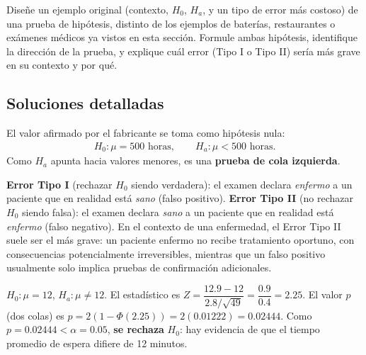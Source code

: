 \begin{problema}
	\label{prob:d04b6da}
	Diseñe un ejemplo original (contexto, $H_0$, $H_a$, y un tipo de error más costoso) de una prueba de hipótesis, distinto de los ejemplos de baterías, restaurantes o exámenes médicos ya vistos en esta sección. Formule ambas hipótesis, identifique la dirección de la prueba, y explique cuál error (Tipo I o Tipo II) sería más grave en su contexto y por qué.
\end{problema}

\subsection*{Soluciones detalladas}

\begin{solproblema}
	El valor afirmado por el fabricante se toma como hipótesis nula:
	\begin{align*}
		H_0: \mu=500\text{ horas}, \qquad H_a: \mu<500\text{ horas}.
	\end{align*}
	Como $H_a$ apunta hacia valores menores, es una \textbf{prueba de cola izquierda}.
\end{solproblema}

\begin{solproblema}[prob:78013c6]
	\textbf{Error Tipo I} (rechazar $H_0$ siendo verdadera): el examen declara \emph{enfermo} a un paciente que en realidad está \emph{sano} (falso positivo). \textbf{Error Tipo II} (no rechazar $H_0$ siendo falsa): el examen declara \emph{sano} a un paciente que en realidad está \emph{enfermo} (falso negativo). En el contexto de una enfermedad, el Error Tipo II suele ser el más grave: un paciente enfermo no recibe tratamiento oportuno, con consecuencias potencialmente irreversibles, mientras que un falso positivo usualmente solo implica pruebas de confirmación adicionales.
\end{solproblema}

\begin{solproblema}[prob:74dc84f]
	$H_0:\mu=12$, $H_a:\mu\neq12$. El estadístico es $Z = \dfrac{12.9-12}{2.8/\sqrt{49}} = \dfrac{0.9}{0.4} = 2.25$. El valor $p$ (dos colas) es $p=2(1-\Phi(2.25))=2(0.01222)=0.02444$. Como $p=0.02444<\alpha=0.05$, \textbf{se rechaza} $H_0$: hay evidencia de que el tiempo promedio de espera difiere de 12 minutos.
\end{solproblema}

